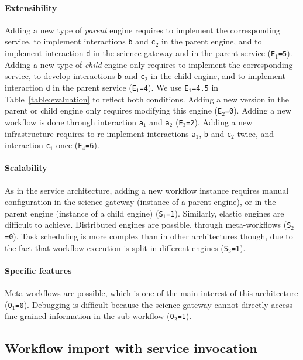 \documentclass[preprint,3p,twocolumn]{elsarticle}
\begin{document}
\paragraph{Extensibility} Adding a new type of \emph{parent} engine
requires to implement the corresponding service, to implement
interactions \texttt{b} and \texttt{c$_2$} in the parent engine, and
to implement interaction \texttt{d} in the science gateway and in the
parent service (\texttt{E$_1$=5}). Adding a new type of \emph{child}
engine only requires to implement the corresponding service, to
develop interactions \texttt{b} and \texttt{c$_2$} in the child
engine, and to implement interaction \texttt{d} in the parent service
(\texttt{E$_1$=4}). We use \texttt{E$_1$=4.5} in
Table~\ref{table:evaluation} to reflect both conditions. Adding a new
version in the parent or child engine only requires modifying this
engine (\texttt{E$_2$=0}). Adding a new
workflow is done through interaction \texttt{a$_1$} and \texttt{a$_2$}
(\texttt{E$_3$=2}). Adding a new infrastructure requires to
re-implement interactions \texttt{a$_1$}, \texttt{b} and \texttt{c$_2$} twice, and
interaction \texttt{c$_1$} once (\texttt{E$_4$=6}).

\paragraph{Scalability} As in the service architecture, adding a new
workflow instance requires manual configuration in the science gateway
(instance of a parent engine), or in the parent engine (instance of a
child engine) (\texttt{S$_1$=1}). Similarly, elastic engines are
difficult to achieve. Distributed engines are
possible, through meta-workflows (\texttt{S$_2$=0}). Task scheduling
is more complex than in other architectures though, due to the fact
that workflow execution is split in different engines (\texttt{S$_3$=1}).

\paragraph{Specific features}
Meta-workflows are possible, which is one of the main interest of this
architecture (\texttt{O$_1$=0}).  Debugging is difficult because the
science gateway cannot directly access fine-grained information in the
sub-workflow (\texttt{O$_2$=1}).

\subsection{Workflow import with service invocation}
\end{document}
